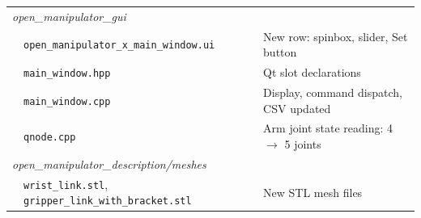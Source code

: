 \documentclass[conference]{IEEEtran}
\begin{document}
\begin{table}[t]
\begin{tabular}{lll}
				\midrule
				\multicolumn{3}{l}{\textit{open\_manipulator\_gui}} \\[2pt]
				& \texttt{open\_manipulator\_x\_main\_window.ui}           & New row: spinbox, slider, Set button \\
				& \texttt{main\_window.hpp}                                 & Qt slot declarations \\
				& \texttt{main\_window.cpp}                                 & Display, command dispatch, CSV updated \\
				& \texttt{qnode.cpp}                                        & Arm joint state reading: 4 $\rightarrow$ 5 joints \\
				\midrule
				\multicolumn{3}{l}{\textit{open\_manipulator\_description/meshes}} \\[2pt]
				& \texttt{wrist\_link.stl}, \texttt{gripper\_link\_with\_bracket.stl} & New STL mesh files \\
				\bottomrule
			\end{tabular}
		\end{table}
		
		
		
	
	
		
\end{document}
